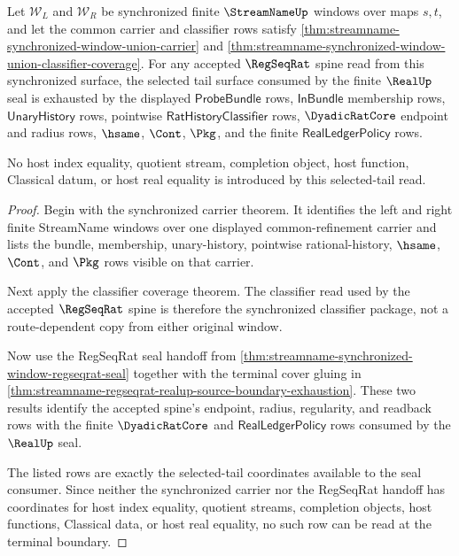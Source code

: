 \begin{theorem}
\label{thm:streamname-synchronized-window-selected-tail-exhaustion}
Let $\mathcal W_L$ and $\mathcal W_R$ be synchronized finite
$\StreamNameUp$ windows over maps $s,t$, and let the common carrier and
classifier rows satisfy
\autoref{thm:streamname-synchronized-window-union-carrier} and
\autoref{thm:streamname-synchronized-window-union-classifier-coverage}. For
any accepted $\RegSeqRat$ spine read from this synchronized surface, the
selected tail surface consumed by the finite $\RealUp$ seal is exhausted by
the displayed $\mathsf{ProbeBundle}$ rows, $\mathsf{InBundle}$ membership
rows, $\mathsf{UnaryHistory}$ rows, pointwise
$\mathsf{RatHistoryClassifier}$ rows, $\DyadicRatCore$ endpoint and radius
rows, $\hsame$, $\Cont$, $\Pkg$, and the finite $\mathsf{RealLedgerPolicy}$
rows.

No host index equality, quotient stream, completion object, host function,
Classical datum, or host real equality is introduced by this selected-tail
read.
\end{theorem}
\begin{proof}
Begin with the synchronized carrier theorem. It identifies the left and right
finite StreamName windows over one displayed common-refinement carrier and
lists the bundle, membership, unary-history, pointwise rational-history,
$\hsame$, $\Cont$, and $\Pkg$ rows visible on that carrier.

Next apply the classifier coverage theorem. The classifier read used by the
accepted $\RegSeqRat$ spine is therefore the synchronized classifier package,
not a route-dependent copy from either original window.

Now use the RegSeqRat seal handoff from
\autoref{thm:streamname-synchronized-window-regseqrat-seal} together with the
terminal cover gluing in
\autoref{thm:streamname-regseqrat-realup-source-boundary-exhaustion}. These
two results identify the accepted spine's endpoint, radius, regularity, and
readback rows with the finite $\DyadicRatCore$ and $\mathsf{RealLedgerPolicy}$
rows consumed by the $\RealUp$ seal.

The listed rows are exactly the selected-tail coordinates available to the
seal consumer. Since neither the synchronized carrier nor the RegSeqRat
handoff has coordinates for host index equality, quotient streams, completion
objects, host functions, Classical data, or host real equality, no such row can
be read at the terminal boundary.
\end{proof}

